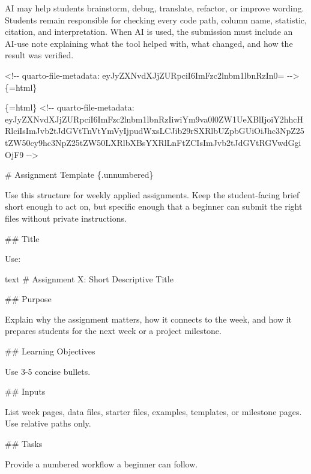 \documentclass[
  letterpaper,
  DIV=11,
  numbers=noendperiod,
  oneside]{scrreprt}
\newenvironment{Shaded}{\begin{snugshade}}{\end{snugshade}}
\newcommand{\FunctionTok}[1]{\textcolor[rgb]{0.28,0.35,0.67}{#1}}
\newcommand{\InformationTok}[1]{\textcolor[rgb]{0.37,0.37,0.37}{#1}}
\newcommand{\NormalTok}[1]{\textcolor[rgb]{0.00,0.23,0.31}{#1}}
\begin{document}
\begin{Shaded}
\begin{Highlighting}[numbers=left,,]
\NormalTok{AI may help students brainstorm, debug, translate, refactor, or improve wording. Students remain responsible for checking every code path, column name, statistic, citation, and interpretation. When AI is used, the submission must include an AI{-}use note explaining what the tool helped with, what changed, and how the result was verified.}


\InformationTok{\textasciigrave{}\textless{}!{-}{-} quarto{-}file{-}metadata: eyJyZXNvdXJjZURpciI6ImFzc2lnbm1lbnRzIn0= {-}{-}\textgreater{}\textasciigrave{}}\NormalTok{\{=html\}}

\InformationTok{\textasciigrave{}\textasciigrave{}\textasciigrave{}\{=html\}}
\InformationTok{\textless{}!{-}{-} quarto{-}file{-}metadata: eyJyZXNvdXJjZURpciI6ImFzc2lnbm1lbnRzIiwiYm9va0l0ZW1UeXBlIjoiY2hhcHRlciIsImJvb2tJdGVtTnVtYmVyIjpudWxsLCJib29rSXRlbUZpbGUiOiJhc3NpZ25tZW50cy9hc3NpZ25tZW50LXRlbXBsYXRlLnFtZCIsImJvb2tJdGVtRGVwdGgiOjF9 {-}{-}\textgreater{}}
\InformationTok{\textasciigrave{}\textasciigrave{}\textasciigrave{}}

\FunctionTok{\# Assignment Template \{.unnumbered\}}


\NormalTok{Use this structure for weekly applied assignments. Keep the student{-}facing brief short enough to act on, but specific enough that a beginner can submit the right files without private instructions.}

\FunctionTok{\#\# Title}

\NormalTok{Use:}

\InformationTok{\textasciigrave{}\textasciigrave{}\textasciigrave{}text}
\InformationTok{\# Assignment X: Short Descriptive Title}
\InformationTok{\textasciigrave{}\textasciigrave{}\textasciigrave{}}

\FunctionTok{\#\# Purpose}

\NormalTok{Explain why the assignment matters, how it connects to the week, and how it prepares students for the next week or a project milestone.}

\FunctionTok{\#\# Learning Objectives}

\NormalTok{Use 3{-}5 concise bullets.}

\FunctionTok{\#\# Inputs}

\NormalTok{List week pages, data files, starter files, examples, templates, or milestone pages. Use relative paths only.}

\FunctionTok{\#\# Tasks}

\NormalTok{Provide a numbered workflow a beginner can follow.}


\end{Highlighting}
\end{Shaded}
\end{document}
